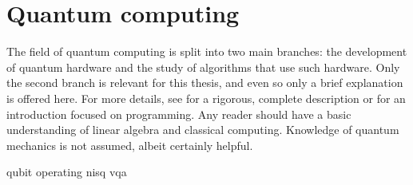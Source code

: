 \chapter{Quantum computing}
\label{chap:qc}
The field of quantum computing is split into two main branches: the development of quantum hardware and the study of algorithms that use such hardware.
Only the second branch is relevant for this thesis, and even so only a brief explanation is offered here.
For more details, see \cite{nielsen2012} for a rigorous, complete description or \cite{qiskit_textbook} for an introduction focused on programming.
Any reader should have a basic understanding of linear algebra and classical computing.
Knowledge of quantum mechanics is not assumed, albeit certainly helpful.

{qubit}
{operating}
{nisq}
{vqa}




